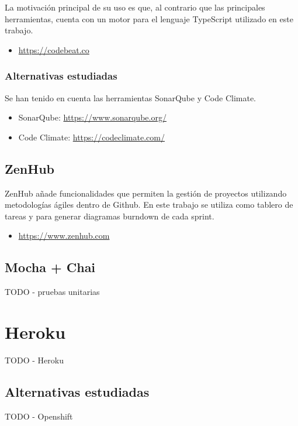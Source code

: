 La motivación principal de su uso es que, al contrario que las principales herramientas, cuenta con un motor para el lenguaje TypeScript utilizado en este trabajo.

\begin{itemize}
	\item \url{https://codebeat.co}
\end{itemize}

\subsubsection{Alternativas estudiadas}

Se han tenido en cuenta las herramientas SonarQube y Code Climate.
\begin{itemize}
	\item SonarQube: \url{https://www.sonarqube.org/}
	\item Code Climate: \url{https://codeclimate.com/}
\end{itemize}

\subsection{ZenHub}

ZenHub añade funcionalidades que permiten la gestión de proyectos utilizando metodologías ágiles dentro de Github. En este trabajo se utiliza como tablero de tareas y para generar diagramas burndown de cada sprint.

\begin{itemize}
	\item \url{https://www.zenhub.com}
\end{itemize}

\subsection{Mocha + Chai}

TODO - pruebas unitarias

\section{Heroku}

TODO - Heroku

\subsection{Alternativas estudiadas}

TODO - Openshift


